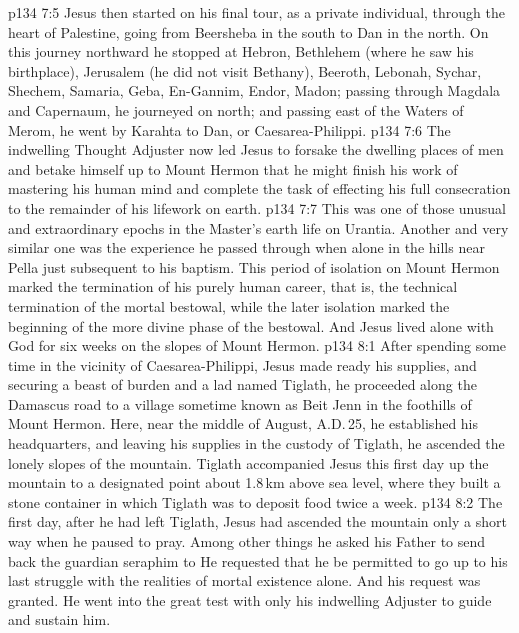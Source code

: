 \vs p134 7:5 Jesus then started on his final tour, as a private individual, through the heart of Palestine, going from Beersheba in the south to Dan in the north. On this journey northward he stopped at Hebron, Bethlehem (where he saw his birthplace), Jerusalem (he did not visit Bethany), Beeroth, Lebonah, Sychar, Shechem, Samaria, Geba, En\hyp{}Gannim, Endor, Madon; passing through Magdala and Capernaum, he journeyed on north; and passing east of the Waters of Merom, he went by Karahta to Dan, or Caesarea\hyp{}Philippi.
\vs p134 7:6 The indwelling Thought Adjuster now led Jesus to forsake the dwelling places of men and betake himself up to Mount Hermon that he might finish his work of mastering his human mind and complete the task of effecting his full consecration to the remainder of his lifework on earth.
\vs p134 7:7 This was one of those unusual and extraordinary epochs in the Master’s earth life on Urantia. Another and very similar one was the experience he passed through when alone in the hills near Pella just subsequent to his baptism. This period of isolation on Mount Hermon marked the termination of his purely human career, that is, the technical termination of the mortal bestowal, while the later isolation marked the beginning of the more divine phase of the bestowal. And Jesus lived alone with God for six weeks on the slopes of Mount Hermon.
\vs p134 8:1 After spending some time in the vicinity of Caesarea\hyp{}Philippi, Jesus made ready his supplies, and securing a beast of burden and a lad named Tiglath, he proceeded along the Damascus road to a village sometime known as Beit Jenn in the foothills of Mount Hermon. Here, near the middle of August, A.D.\,25, he established his headquarters, and leaving his supplies in the custody of Tiglath, he ascended the lonely slopes of the mountain. Tiglath accompanied Jesus this first day up the mountain to a designated point about 1.8\,km above sea level, where they built a stone container in which Tiglath was to deposit food twice a week.
\vs p134 8:2 The first day, after he had left Tiglath, Jesus had ascended the mountain only a short way when he paused to pray. Among other things he asked his Father to send back the guardian seraphim to  He requested that he be permitted to go up to his last struggle with the realities of mortal existence alone. And his request was granted. He went into the great test with only his indwelling Adjuster to guide and sustain him.
